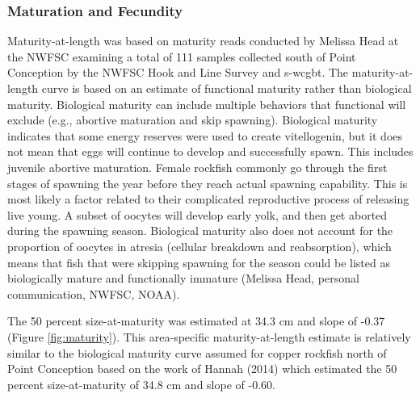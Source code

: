 \documentclass[11pt,
  english,
  a4paper,
]{article}
\begin{document}
\leavevmode\tagmcend\tagstructend\par


\hypertarget{maturation-and-fecundity}{%
\subsubsection{Maturation and Fecundity}\label{maturation-and-fecundity}}

\leavevmode\tagmcend\tagstructend


Maturity-at-length was based on maturity reads conducted by Melissa Head at the NWFSC examining a total of 111 samples collected south of Point Conception by the NWFSC Hook and Line Survey and \Gls{s-wcgbt}. The maturity-at-length curve is based on an estimate of functional maturity rather than biological maturity. Biological maturity can include multiple behaviors that functional will exclude (e.g., abortive maturation and skip spawning). Biological maturity indicates that some energy reserves were used to create vitellogenin, but it does not mean that eggs will continue to develop and successfully spawn. This includes juvenile abortive maturation. Female rockfish commonly go through the first stages of spawning the year before they reach actual spawning capability. This is most likely a factor related to their complicated reproductive process of releasing live young. A subset of oocytes will develop early yolk, and then get aborted during the spawning season. Biological maturity also does not account for the proportion of oocytes in atresia (cellular breakdown and reabsorption), which means that fish that were skipping spawning for the season could be listed as biologically mature and functionally immature (Melissa Head, personal communication, NWFSC, NOAA).

\leavevmode\tagmcend\tagstructend\par


The 50 percent size-at-maturity was estimated at 34.3 cm and slope of -0.37 (Figure \ref{fig:maturity}). This area-specific maturity-at-length estimate is relatively similar to the biological maturity curve assumed for copper rockfish north of Point Conception based on the work of Hannah {(2014)\leavevmode\tagmcend\tagstructend} which estimated the 50 percent size-at-maturity of 34.8 cm and slope of -0.60.
\end{document}
